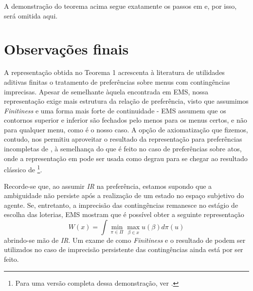 \documentclass[11pt, a4paper]{article}
\theoremstyle{nonumberplain}
\theoremstyle{plain}
\theoremstyle{plain}
\theoremstyle{plain}
\begin{document}
\noindent
A demonstração do teorema acima segue exatamente os passos em \cite{Gilboa2010} e, por isso, será omitida aqui.

\section{Observações finais}

A representação obtida no Teorema 1 acrescenta à literatura de utilidades aditivas finitas o tratamento de preferências sobre menus com contingências imprecisas. Apesar de semelhante àquela encontrada em EMS, nossa representação exige mais estrutura da relação de preferência, visto que assumimos \emph{Finitiness} e uma forma mais forte de continuidade - EMS assumem que os contornos superior e inferior são fechados pelo menos para os menus certos, e não para qualquer menu, como é o nosso caso. A opção de axiomatização que fizemos, contudo, nos permitiu aproveitar o resultado da representação para preferências incompletas de \cite{Kochov2007}, à semelhança do que é feito no caso de preferências sobre atos, onde a representação em \cite{Bewley1986a} pode ser usada como degrau para se chegar ao resultado clássico de \cite{Gilboa1989}\footnote{Para uma versão completa dessa demonstração, ver \cite{Riella2014}.}.  

Recorde-se que, ao assumir \emph{IR} na preferência, estamos supondo que a ambiguidade não persiste após a realização de um estado no espaço subjetivo do agente. Se, entretanto, a imprecisão das contingências remanesce no estágio de escolha das loterias, EMS mostram que é possível obter a seguinte representação
$$W(x)=\int \min_{\pi\in\Pi} \max_{\beta\in x}u(\beta)d\pi(u) $$  
abrindo-se mão de \emph{IR}. Um exame de como \emph{Finitiness} e o resultado de \cite{Kochov2007} podem ser utilizados no caso de imprecisão persistente das contingências ainda está por ser feito.
\clearpage  


\end{document}
